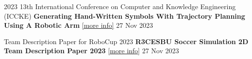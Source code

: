 
\begin{cventries}
    \cventry
    {2023 13th International Conference on Computer and Knowledge Engineering (ICCKE)}
    {\textbf {Generating Hand-Written Symbols With Trajectory Planning Using A Robotic Arm}
    \href{https://ieeexplore.ieee.org/document/10326253}{\textcolor{cobalt}{[more info]}}}
    {}
    {27 Nov 2023}
    {}
    \vspace{0.35 cm}

    
\end{cventries}

\begin{cventries}
    \cventry
    {Team Description Paper for RoboCup 2023}
    {\textbf {R3CESBU Soccer Simulation 2D Team Description Paper 2023}
    \href{https://archive.robocup.info/Soccer/Simulation/2D/TDPs/RoboCup/2023/R3CESBU_SS2D_RC2023_TDP.pdf}{\textcolor{cobalt}{[more info]}}}
    {}
    {27 Nov 2023}
    {}
    \vspace{0.35 cm}
\end{cventries}